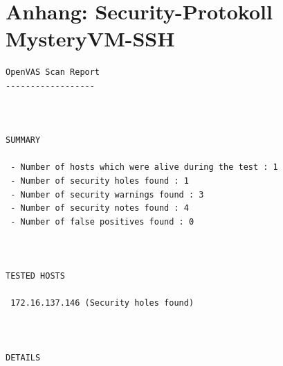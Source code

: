 \documentclass[twoside]{article}
\begin{document}
\section*{Anhang: Security-Protokoll MysteryVM-SSH}
\label{secprotmvmssh}
\begin{lstlisting}
OpenVAS Scan Report
------------------



SUMMARY

 - Number of hosts which were alive during the test : 1
 - Number of security holes found : 1
 - Number of security warnings found : 3
 - Number of security notes found : 4
 - Number of false positives found : 0



TESTED HOSTS

 172.16.137.146 (Security holes found)



DETAILS


\end{lstlisting}
\end{document}
